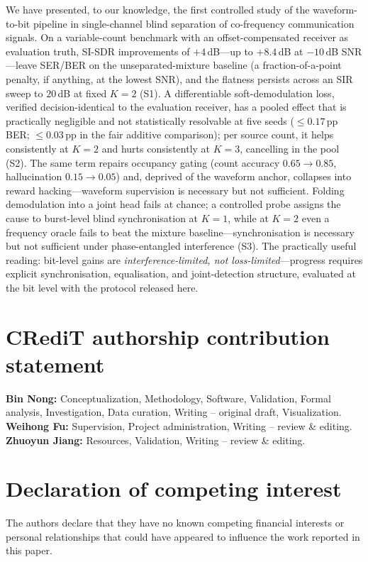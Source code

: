 \documentclass[review,12pt]{elsarticle}
\begin{document}
We have presented, to our knowledge, the first controlled study of the
waveform-to-bit pipeline in single-channel blind separation of
co-frequency communication signals. On a variable-count benchmark with
an offset-compensated receiver as evaluation truth, SI-SDR improvements
of $+4$\,dB---up to $+8.4$\,dB at $-10$\,dB SNR---leave SER/BER on the
unseparated-mixture baseline (a fraction-of-a-point penalty, if
anything, at the lowest SNR), and the flatness persists across an SIR
sweep to $20$\,dB at fixed $K{=}2$ (S1). A differentiable soft-demodulation
loss, verified decision-identical to the evaluation receiver, has a
pooled effect that is practically negligible and not statistically
resolvable at five seeds
($\leq 0.17$\,pp BER; $\leq 0.03$\,pp in the fair additive comparison);
per source count, it helps consistently at $K{=}2$ and hurts
consistently at $K{=}3$, cancelling in the pool (S2). The same term
repairs occupancy gating (count accuracy $0.65 \to 0.85$, hallucination
$0.15 \to 0.05$) and, deprived of the waveform anchor, collapses into
reward hacking---waveform supervision is necessary but not sufficient.
Folding demodulation into a joint head fails at chance; a controlled
probe assigns the cause to burst-level blind synchronisation at $K{=}1$,
while at $K{=}2$ even a frequency oracle fails to beat the mixture
baseline---synchronisation is necessary but not sufficient under
phase-entangled interference (S3). The
practically useful reading: bit-level gains
are \emph{interference-limited, not loss-limited}---progress requires
explicit synchronisation, equalisation, and joint-detection structure,
evaluated at the bit level with the protocol released here.

\section*{CRediT authorship contribution statement}
\textbf{Bin Nong:} Conceptualization, Methodology, Software, Validation,
Formal analysis, Investigation, Data curation, Writing -- original
draft, Visualization.
\textbf{Weihong Fu:} Supervision, Project administration, Writing --
review \& editing.
\textbf{Zhuoyun Jiang:} Resources, Validation, Writing -- review \&
editing.

\section*{Declaration of competing interest}
The authors declare that they have no known competing financial
interests or personal relationships that could have appeared to
influence the work reported in this paper.
\end{document}
